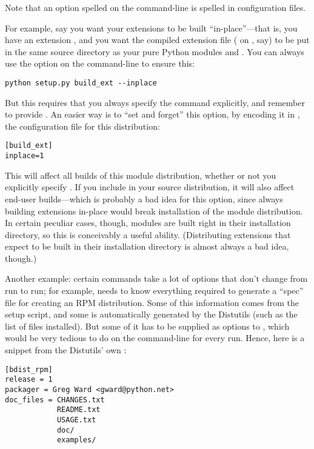 \documentclass{manual}
\begin{document}
Note that an option spelled  on the command-line 
is spelled  in configuration files.

For example, say you want your extensions to be built
``in-place''---that is, you have an extension , and you
want the compiled extension file ( on \UNIX, say) to be put
in the same source directory as your pure Python modules
 and .  You can always use the
 option on the command-line to ensure this:

\begin{verbatim}
python setup.py build_ext --inplace
\end{verbatim}

But this requires that you always specify the 
command explicitly, and remember to provide .
An easier way is to ``set and forget'' this option, by encoding it in
, the configuration file for this distribution:

\begin{verbatim}
[build_ext]
inplace=1
\end{verbatim}

This will affect all builds of this module distribution, whether or not
you explicitly specify .  If you include
 in your source distribution, it will also affect
end-user builds---which is probably a bad idea for this option, since
always building extensions in-place would break installation of the
module distribution.  In certain peculiar cases, though, modules are
built right in their installation directory, so this is conceivably a
useful ability.  (Distributing extensions that expect to be built in
their installation directory is almost always a bad idea, though.)

Another example: certain commands take a lot of options that don't
change from run to run; for example,  needs to know
everything required to generate a ``spec'' file for creating an RPM
distribution.  Some of this information comes from the setup script, and
some is automatically generated by the Distutils (such as the list of
files installed).  But some of it has to be supplied as options to
, which would be very tedious to do on the
command-line for every run.  Hence, here is a snippet from the
Distutils' own :

\begin{verbatim}
[bdist_rpm]
release = 1
packager = Greg Ward <gward@python.net>
doc_files = CHANGES.txt
            README.txt
            USAGE.txt
            doc/
            examples/
\end{verbatim}
\end{document}
